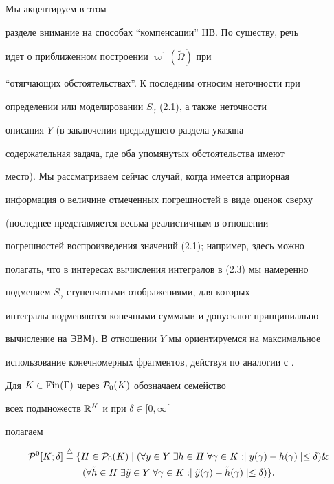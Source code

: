 Мы акцентируем в этом


разделе внимание на способах ``компенсации'' НВ. По существу, речь


идет о приближенном построении $\varpi^1(\tilde\Omega)$ при


``отягчающих обстоятельствах''. К последним относим неточности при


определении или моделировании $S_\gamma$ (2.1), а также неточности


описания $Y$ (в заключении предыдущего раздела указана


содержательная задача, где оба упомянутых обстоятельства имеют


место). Мы рассматриваем сейчас случай, когда имеется априорная


информация о величине отмеченных погрешностей в виде оценок сверху


(последнее представляется весьма реалистичным в отношении


погрешностей воспроизведения значений (2.1); например, здесь можно


полагать, что в интересах вычисления интегралов в (2.3) мы намеренно


подменяем $S_\gamma$ ступенчатыми отображениями, для которых


интегралы подменяются конечными суммами и допускают принципиально


вычисление на ЭВМ). В отношении $Y$ мы ориентируемся на максимальное


использование конечномерных фрагментов, действуя по аналогии с \cite{Ch7}.


Для $K \in \operatorname{Fin}(\Gamma)$ через ${\cal P}_0(K)$ обозначаем семейство


всех подмножеств ${\Bbb R}^K$ и при $\delta \in [0,\infty[$


полагаем


\begin{multline}


{\cal P}^0[K; \delta] \stac \{H \in {\cal P}_0(K) \mid (\forall y


\in Y \; \exists h \in H \; \forall \gamma \in K: \mid y(\gamma) -


h(\gamma)\mid \le \delta) \& \\


(\forall \tilde h \in H \; \exists\tilde y \in Y\; \forall \gamma


\in K:


\mid \tilde y(\gamma) - \tilde h(\gamma)\mid \le \delta)\}.


\end{multline}


